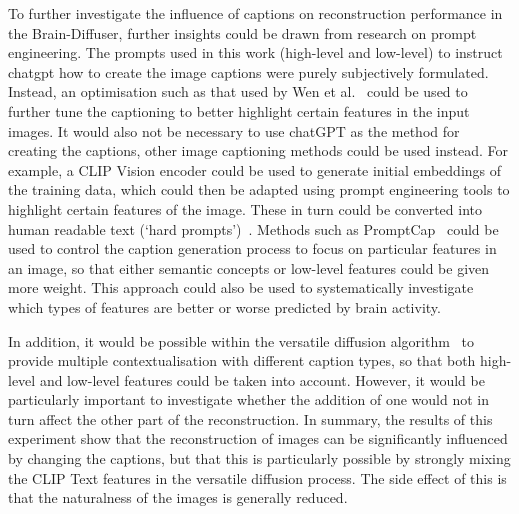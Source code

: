 To further investigate the influence of captions on reconstruction performance in the Brain-Diffuser, further insights could be drawn from research on prompt engineering. The prompts used in this work (high-level and low-level) to instruct chatgpt how to create the image captions were purely subjectively formulated. Instead, an optimisation such as that used by Wen et al.~\cite{wenHardPromptsMade2023} could be used to further tune the captioning to better highlight certain features in the input images. It would also not be necessary to use chatGPT as the method for creating the captions, other image captioning methods could be used instead. For example, a CLIP Vision encoder could be used to generate initial embeddings of the training data, which could then be adapted using prompt engineering tools to highlight certain features of the image. These in turn could be converted into human readable text (`hard prompts')~\cite{wenHardPromptsMade2023}. Methods such as PromptCap~\cite{Hu_2023_ICCV} could be used to control the caption generation process to focus on particular features in an image, so that either semantic concepts or low-level features could be given more weight. This approach could also be used to systematically investigate which types of features are better or worse predicted by brain activity. 

In addition, it would be possible within the versatile diffusion algorithm~\cite{xuVersatileDiffusionText2024} to provide multiple contextualisation with different caption types, so that both high-level and low-level features could be taken into account. However, it would be particularly important to investigate whether the addition of one would not in turn affect the other part of the reconstruction. In summary, the results of this experiment show that the reconstruction of images can be significantly influenced by changing the captions, but that this is particularly possible by strongly mixing the CLIP Text features in the versatile diffusion process. The side effect of this is that the naturalness of the images is generally reduced. 


